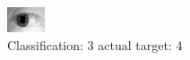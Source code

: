 \begin{figure}[h!]
\begin{center}
\includegraphics[width=0.60\columnwidth]{figures/ID1220_class_3_target_4.png}
\end{center}
\caption{ Classification: 3 actual target: 4}
\label{fig:ID1220_class_3_target_4}
\end{figure}
